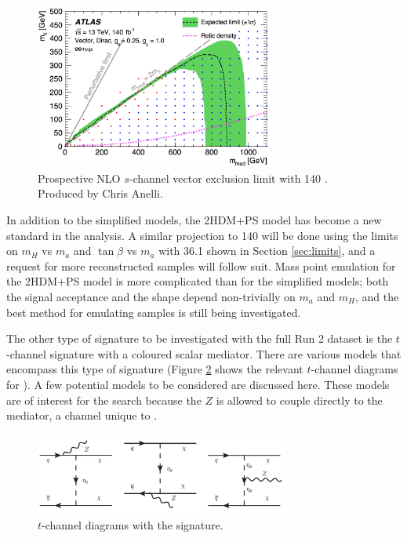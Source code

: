 \begin{figure}[htb]
\centering
\includegraphics[width=0.7\textwidth]{Figures/140ifb.png}
\caption{Prospective NLO $s$-channel vector exclusion limit with 140 \ifb. Produced by Chris Anelli.}
\label{fig:140limits}
\end{figure}

In addition to the simplified models, the 2HDM+PS model has become a new standard in the analysis. A similar projection to 140 \ifb will be done using the limits on $m_H$ vs $m_a$ and $\tan \beta$ vs $m_a$ with 36.1 \ifb shown in Section \ref{sec:limits}, and a request for more reconstructed samples will follow suit. Mass point emulation for the 2HDM+PS model is more complicated than for the simplified models; both the signal acceptance and the \etmiss shape depend non-trivially on $m_a$ and $m_H$, and the best method for emulating samples is still being investigated.

The other type of signature to be investigated with the full Run 2 dataset is the $t$-channel signature with a coloured scalar mediator. There are various models that encompass this type of signature (Figure \ref{fig:tchan_bell} shows the relevant $t$-channel diagrams for \monoZ). A few potential models to be considered are discussed here. These models are of interest for the \monoZ search because the $Z$ is allowed to couple directly to the mediator, a channel unique to \monoZ.

\begin{figure}[htb]
\centering
\includegraphics[width=0.75\textwidth]{Figures/tchan_bell.png}
\caption{$t$-channel diagrams with the \monoZ signature.}
\label{fig:tchan_bell}
\end{figure}

